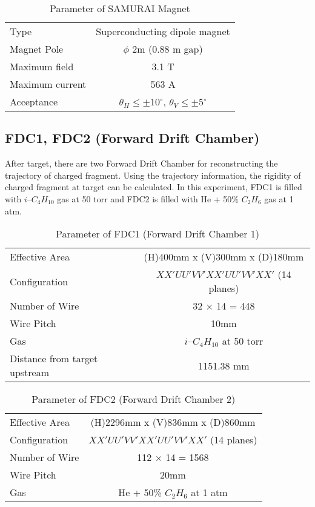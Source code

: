 \begin{table}[h]
    \centering 
    \begin{tabular}{l|c}
    \hline
    Type & Superconducting dipole magnet \\
    Magnet Pole & $\phi$ 2m (0.88 m gap) \\
    Maximum field & 3.1 T \\
    Maximum current & 563 A \\
    Acceptance & $\theta_H \leq \pm 10{}^{\circ}$, $\theta_V \leq \pm 5{}^{\circ}$\\
    \hline
    \end{tabular}
    \caption{Parameter of SAMURAI Magnet \cite{SAMURAI}}
\end{table}

\subsection{FDC1, FDC2 (Forward Drift Chamber)}
After target, there are two Forward Drift Chamber for reconstructing the trajectory of charged fragment. Using the trajectory information, the rigidity of charged fragment at target can be calculated. In this experiment, FDC1 is filled with $i$--${C}_{4} {H}_{10}$ gas at 50 torr and FDC2 is filled with He + 50\% ${C}_{2} {H}_{6}$ gas at 1 atm. 

\begin{table}[h]
    \centering
    \begin{tabular}{l|c}
        \hline
        Effective Area & (H)400mm x (V)300mm x (D)180mm\\
        Configuration & $XX'UU'VV'XX'UU'VV'XX'$ (14 planes)\\
        Number of Wire & 32 $\times$ 14 = 448 \\
        Wire Pitch & 10mm \\
        Gas & $i$--${C}_{4} {H}_{10}$ at 50 torr\\
        Distance from target upstream & 1151.38 mm  \\
        \hline
    \end{tabular}
    \caption{Parameter of FDC1 (Forward Drift Chamber 1) \cite{SAMURAI}}
\end{table}

\begin{table}[h]
    \centering
    \begin{tabular}{l|c}
        \hline
        Effective Area & (H)2296mm x (V)836mm x (D)860mm\\
        Configuration & $XX'UU'VV'XX'UU'VV'XX'$ (14 planes)\\
        Number of Wire & 112 $\times$ 14 = 1568 \\
        Wire Pitch & 20mm \\
        Gas & He + 50\% ${C}_{2} {H}_{6}$ at 1 atm\\
        \hline
    \end{tabular}
    \caption{Parameter of FDC2 (Forward Drift Chamber 2) \cite{SAMURAI}}
\end{table}

